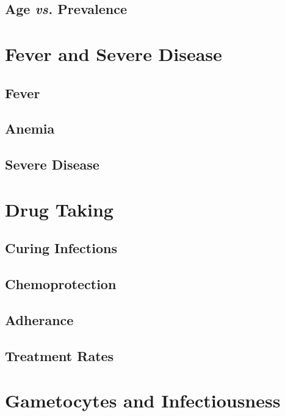 \documentclass[
]{book}
\begin{document}
\section{\texorpdfstring{Age \emph{vs.} Prevalence}{Age vs. Prevalence}}\label{age-vs.-prevalence}

\chapter{Fever and Severe Disease}\label{fever-and-severe-disease}

\section{Fever}\label{fever}

\section{Anemia}\label{anemia}

\section{Severe Disease}\label{severe-disease}

\chapter{Drug Taking}\label{drug-taking}

\section{Curing Infections}\label{curing-infections}

\section{Chemoprotection}\label{chemoprotection}

\section{Adherance}\label{adherance}

\section{Treatment Rates}\label{treatment-rates}

\chapter{Gametocytes and Infectiousness}\label{gametocytes-and-infectiousness-1}
\end{document}
